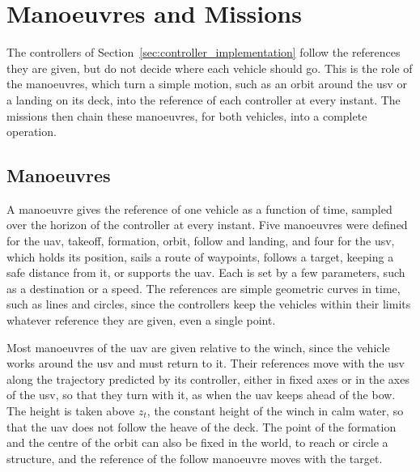 
\section{Manoeuvres and Missions}
\label{sec:maneuvers_and_missions}

The controllers of Section~\ref{sec:controller_implementation} follow the references they are given, but do not decide where each vehicle should go. This is the role of the manoeuvres, which turn a simple motion, such as an orbit around the \gls{usv} or a landing on its deck, into the reference of each controller at every instant. The missions then chain these manoeuvres, for both vehicles, into a complete operation.

\subsection{Manoeuvres}
\label{subsec:maneuver_primitives}

A manoeuvre gives the reference of one vehicle as a function of time, sampled over the horizon of the controller at every instant. Five manoeuvres were defined for the \gls{uav}, takeoff, formation, orbit, follow and landing, and four for the \gls{usv}, which holds its position, sails a route of waypoints, follows a target, keeping a safe distance from it, or supports the \gls{uav}. Each is set by a few parameters, such as a destination or a speed. The references are simple geometric curves in time, such as lines and circles, since the controllers keep the vehicles within their limits whatever reference they are given, even a single point.

Most manoeuvres of the \gls{uav} are given relative to the winch, since the vehicle works around the \gls{usv} and must return to it. Their references move with the \gls{usv} along the trajectory predicted by its controller, either in fixed axes or in the axes of the \gls{usv}, so that they turn with it, as when the \gls{uav} keeps ahead of the bow. The height is taken above $z_t$, the constant height of the winch in calm water, so that the \gls{uav} does not follow the heave of the deck. The point of the formation and the centre of the orbit can also be fixed in the world, to reach or circle a structure, and the reference of the follow manoeuvre moves with the target.

